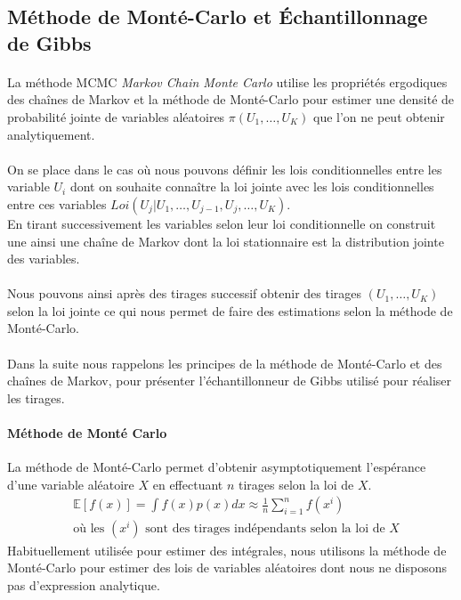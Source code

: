 \documentclass{article}
\theoremstyle{definition}
\theoremstyle{remark}
\begin{document}
\subsection{Méthode de Monté-Carlo et Échantillonnage de Gibbs}

\paragraph{}
La méthode MCMC \textit{Markov Chain Monte Carlo} utilise les propriétés ergodiques des chaînes de Markov 
et la méthode de Monté-Carlo pour estimer une densité de probabilité jointe de variables aléatoires  $\pi(U_1, \ldots, U_K)$
que l'on ne peut obtenir analytiquement.

\paragraph{}
On se place dans le cas où nous pouvons définir les lois conditionnelles entre les variable $U_i$
dont on souhaite connaître la loi jointe avec les lois conditionnelles entre ces variables 
${Loi}(U_j|U_1, \ldots, U_{j-1}, U_j, \dots, U_K)$. \\ En tirant successivement les variables selon leur loi conditionnelle 
on construit une ainsi une chaîne de Markov dont la loi stationnaire est la distribution jointe des variables.    
\paragraph{}
Nous pouvons ainsi après des tirages successif obtenir des tirages $(U_1, \ldots, U_K)$ selon la loi jointe ce qui nous permet 
de faire des estimations selon la méthode de Monté-Carlo.
\paragraph{}
Dans la suite nous rappelons les principes de la méthode de Monté-Carlo et des chaînes de Markov, pour présenter 
l'échantillonneur de Gibbs utilisé pour réaliser les tirages.

\paragraph{Méthode de Monté Carlo \\}
La méthode de Monté-Carlo permet d'obtenir asymptotiquement l'espérance d'une variable aléatoire $X$ 
en effectuant $n$ tirages selon la loi de $X$.
$$
\begin{aligned}
	&\mathbb{E}[f(x)]=\int f(x) p(x) d x \approx \frac{1}{n} \sum_{i=1}^{n} f\left(x^{i}\right) \\
	&\text{où les } (x^i) \text{ sont des tirages indépendants selon la loi de } X 
\end{aligned}
$$
Habituellement utilisée pour estimer des intégrales, nous utilisons la méthode de Monté-Carlo pour estimer des lois de 
variables aléatoires dont nous ne disposons pas d'expression analytique.   
\end{document}
